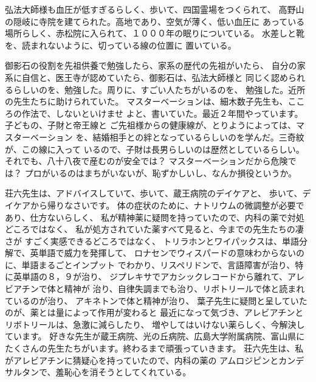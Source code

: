 \documentclass{jsarticle}
\begin{document}
        弘法大師様も血圧が低すぎるらしく、歩いて、四国霊場をつくられて、
    高野山の隠岐に寺院を建てられた。高地であり、空気が薄く、低い血圧に
    あっている場所らしく、赤松院に入られて、１０００年の眠りについている。
    水差しと靴を、読まれないように、切っている線の位置に
    置いている。




        御影石の役割を先祖供養で勉強したら、家系の歴代の先祖がいたら、
    自分の家系に自信と、医王寺が認めていたら、御影石は、弘法大師様と
    同じく認められるらしいのを、勉強した。周りに、すごい人たちがいるのを、
    勉強した。近所の先生たちに助けられていた。
    マスターベーションは、細木数子先生も、こころの作法で、しないといけませ
    よと、書いていた。最近２年間やっています。子どもの、子財と帝王線と
    ご先祖様からの健康線が、とりようによっては、マスターベーション
    を、結婚相手との絆となっているらしいのを学んだ。三奇紋が、この線に入って
    いるので、子財は長男らしいのは歴然としているらしい。
    それでも、八十八夜で産むのが安全では？
    マスターベーションだから危険では？
    プロがいるのはまちがいないが、恥ずかしいし、なんか損役というか。　



        荘六先生は、アドバイスしていて、歩いて、蔵王病院のデイケアと、
      歩いて、デイケアから帰りなさいです。
      体の症状のために、ナトリウムの微調整が必要であり、仕方ないらしく、
      私が精神薬に疑問を持っていたので、内科の薬で対処どころではなく、
      私が処方されていた薬すべて見ると、今までの先生たちの凄さが
      すごく実感できるどころではなく、
      トリラホンとワイパックスは、単語分解で、英単語で威力を発揮して、
      ロナセンでウィスパードの意味わからないのに、単語まるごとインプット
      でわかり、リスペリドンで、言語障害が治り、特に英単語の８，９が治り、
      ジプレキサでアカシックレコードから離れて、アレビアチンで体と精神が
      治り、自律失調までも治り、リボトリールで体と読まれているのが治り、
      アキネトンで体と精神が治り、
      葉子先生に疑問と呈していたのが、薬とは量によって作用が変わると
      最近になって気づき、アレビアチンとリボトリールは、急激に減らしたり、
      増やしてはいけない薬らしく、今解決しています。
      好きな先生が蔵王病院、光の丘病院、広島大学附属病院、富山県に
      たくさんの先生たちがいます。終わるまで頑張っていきます。
        荘六先生は、私がアレビアチンに猜疑心を持っていたので、内科の薬の
      アムロジピンとカンデサルタンで、羞恥心を消そうとしてくれている。
\end{document}
